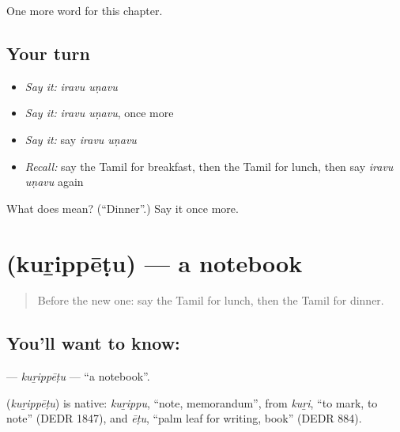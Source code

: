 \begin{grammarlens}[title={What you've built}]
One more word for this chapter.
\end{grammarlens}

\subsection*{Your turn}
\begin{itemize}
\raggedright
  \item \emph{Say it:} \emph{iravu uṇavu}
  \item \emph{Say it:} \emph{iravu uṇavu}, once more
  \item \emph{Say it:} say \emph{iravu uṇavu}
  \item \emph{Recall:} say the Tamil for breakfast, then the Tamil for lunch, then say \emph{iravu uṇavu} again
\end{itemize}

\begin{tcolorbox}[breakable,colback=teal!4,colframe=teal!35!black,title={Before you move on}]
What does   mean? (\textquotedblleft{}Dinner\textquotedblright{}.) Say it once more.
\end{tcolorbox}
\section[\texorpdfstring{\ta{குறிப்பேடு} (kuṟippēṭu)}{குறிப்பேடு (kuṟippēṭu)}]{ (kuṟippēṭu) — a notebook}

\label{lesson:TA-C184-kurippetu}



\begin{quote}
Before the new one: say the Tamil for lunch, then the Tamil for dinner.
\end{quote}

\subsection*{You'll want to know: }
\textbf{} — \emph{kuṟippēṭu} — \textquotedblleft{}a notebook\textquotedblright{}.

\begin{cousinweb}
\textbf{} (\emph{kuṟippēṭu}) is native: \emph{kuṟippu}, \textquotedblleft{}note, memorandum\textquotedblright{}, from \emph{kuṟi}, \textquotedblleft{}to mark, to note\textquotedblright{} (DEDR 1847), and \emph{ēṭu}, \textquotedblleft{}palm leaf for writing, book\textquotedblright{} (DEDR 884).
\end{cousinweb}

